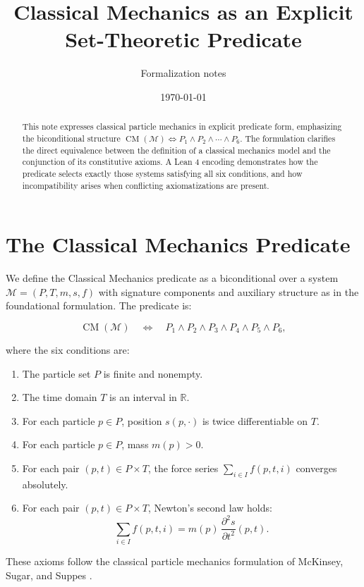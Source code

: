 \documentclass[11pt]{article}
\title{Classical Mechanics as an Explicit Set-Theoretic Predicate}
\author{Formalization notes}
\date{\today}
\begin{document}
\maketitle

\begin{abstract}
This note expresses classical particle mechanics in explicit predicate form,
emphasizing the biconditional structure
$\operatorname{CM}(\mathcal{M}) \iff P_1 \land P_2 \land \cdots \land P_6$.
The formulation clarifies the direct equivalence between the definition of
a classical mechanics model and the conjunction of its constitutive axioms.
A Lean 4 encoding demonstrates how the predicate selects exactly those
systems satisfying all six conditions, and how incompatibility arises when
conflicting axiomatizations are present.
\end{abstract}

\section{The Classical Mechanics Predicate}

We define the Classical Mechanics predicate as a biconditional over a system
$\mathcal{M} = (P, T, m, s, f)$ with signature components and auxiliary
structure as in the foundational formulation. The predicate is:

\[
\operatorname{CM}(\mathcal{M}) \quad\Longleftrightarrow\quad
  P_1 \land P_2 \land P_3 \land P_4 \land P_5 \land P_6,
\]

where the six conditions are:
\begin{enumerate}
  \item[\(P_1\)] The particle set $P$ is finite and nonempty.
  \item[\(P_2\)] The time domain $T$ is an interval in $\mathbb{R}$.
  \item[\(P_3\)] For each particle $p \in P$, position $s(p, \cdot)$ is
    twice differentiable on $T$.
  \item[\(P_4\)] For each particle $p \in P$, mass $m(p) > 0$.
  \item[\(P_5\)] For each pair $(p, t) \in P \times T$, the force series
    $\sum_{i \in I} f(p, t, i)$ converges absolutely.
  \item[\(P_6\)] For each pair $(p, t) \in P \times T$, Newton's second law holds:
    \[
      \sum_{i \in I} f(p, t, i) = m(p)\, \frac{\partial^2 s}{\partial t^2}(p, t).
    \]
\end{enumerate}
These axioms follow the classical particle mechanics formulation of
McKinsey, Sugar, and Suppes \cite{mckinsey1953axiomatic}.
\end{document}
